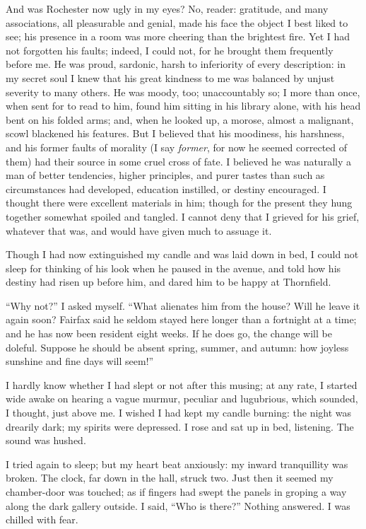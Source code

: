 And was \Mr{}  Rochester now ugly in my eyes? No, reader: gratitude, and
many associations, all pleasurable and genial, made his face the object
I best liked to see; his presence in a room was more cheering than the
brightest fire. Yet I had not forgotten his faults; indeed, I could
not, for he brought them frequently before me. He was proud, sardonic,
harsh to inferiority of every description: in my secret soul I knew that
his great kindness to me was balanced by unjust severity to many
others. He was moody, too; unaccountably so; I more than once, when
sent for to read to him, found him sitting in his library alone, with
his head bent on his folded arms; and, when he looked up, a morose,
almost a malignant, scowl blackened his features. But I believed that
his moodiness, his harshness, and his former faults of morality (I say
\emph{former}, for now he seemed corrected of them) had their source in
some cruel cross of fate. I believed he was naturally a man of better
tendencies, higher principles, and purer tastes than such as
circumstances had developed, education instilled, or destiny
encouraged. I thought there were excellent materials in him; though for
the present they hung together somewhat spoiled and tangled. I cannot
deny that I grieved for his grief, whatever that was, and would have
given much to assuage it.

Though I had now extinguished my candle and was laid down in bed, I
could not sleep for thinking of his look when he paused in the avenue,
and told how his destiny had risen up before him, and dared him to be
happy at Thornfield.

\enquote{Why not?} I asked myself. \enquote{What alienates him from the
	house? Will he leave it again soon? \Mrs{} Fairfax said he seldom stayed
	here longer than a fortnight at a time; and he has now been resident
	eight weeks. If he does go, the change will be doleful. Suppose he
	should be absent spring, summer, and autumn: how joyless sunshine and
	fine days will seem!}

I hardly know whether I had slept or not after this musing; at any rate,
I started wide awake on hearing a vague murmur, peculiar and lugubrious,
which sounded, I thought, just above me. I wished I had kept my candle
burning: the night was drearily dark; my spirits were depressed. I rose
and sat up in bed, listening. The sound was hushed.

I tried again to sleep; but my heart beat anxiously: my inward
tranquillity was broken. The clock, far down in the hall, struck two.
Just then it seemed my chamber-door was touched; as if fingers had swept
the panels in groping a way along the dark gallery outside. I said,
\enquote{Who is there?} Nothing answered. I was chilled with fear.

